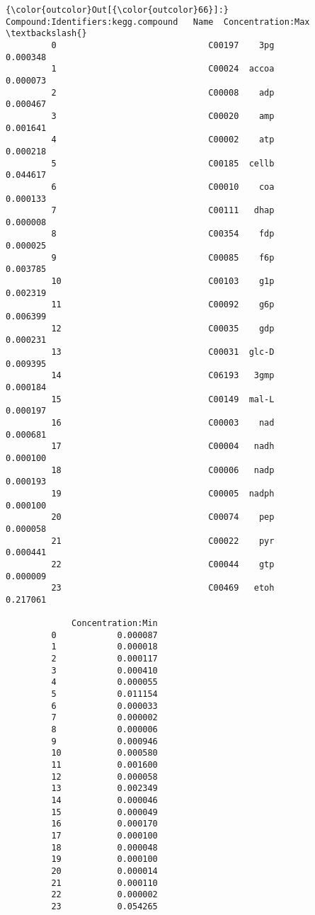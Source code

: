 \documentclass[11pt]{article}
\begin{document}
\begin{Verbatim}[commandchars=\\\{\}]
{\color{outcolor}Out[{\color{outcolor}66}]:}    Compound:Identifiers:kegg.compound   Name  Concentration:Max  \textbackslash{}
         0                              C00197    3pg           0.000348   
         1                              C00024  accoa           0.000073   
         2                              C00008    adp           0.000467   
         3                              C00020    amp           0.001641   
         4                              C00002    atp           0.000218   
         5                              C00185  cellb           0.044617   
         6                              C00010    coa           0.000133   
         7                              C00111   dhap           0.000008   
         8                              C00354    fdp           0.000025   
         9                              C00085    f6p           0.003785   
         10                             C00103    g1p           0.002319   
         11                             C00092    g6p           0.006399   
         12                             C00035    gdp           0.000231   
         13                             C00031  glc-D           0.009395   
         14                             C06193   3gmp           0.000184   
         15                             C00149  mal-L           0.000197   
         16                             C00003    nad           0.000681   
         17                             C00004   nadh           0.000100   
         18                             C00006   nadp           0.000193   
         19                             C00005  nadph           0.000100   
         20                             C00074    pep           0.000058   
         21                             C00022    pyr           0.000441   
         22                             C00044    gtp           0.000009   
         23                             C00469   etoh           0.217061   
         
             Concentration:Min  
         0            0.000087  
         1            0.000018  
         2            0.000117  
         3            0.000410  
         4            0.000055  
         5            0.011154  
         6            0.000033  
         7            0.000002  
         8            0.000006  
         9            0.000946  
         10           0.000580  
         11           0.001600  
         12           0.000058  
         13           0.002349  
         14           0.000046  
         15           0.000049  
         16           0.000170  
         17           0.000100  
         18           0.000048  
         19           0.000100  
         20           0.000014  
         21           0.000110  
         22           0.000002  
         23           0.054265  
\end{Verbatim}
            
\end{document}
